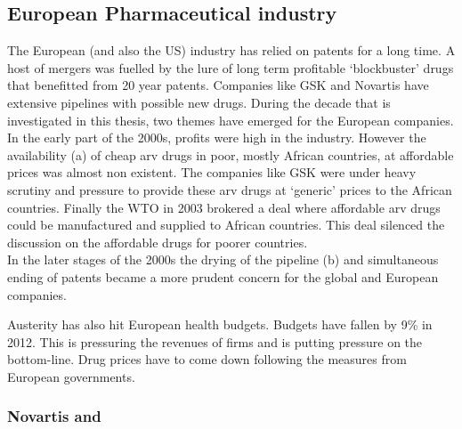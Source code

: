 \subsection{European Pharmaceutical industry}
The European (and also the US) \pharma industry has relied on patents for a long time.
A host of mergers was fuelled by the lure of long term profitable `blockbuster' drugs that benefitted from 20 year patents.
Companies like GSK and Novartis have extensive pipelines with possible new drugs.
During the decade that is investigated in this thesis, two themes have emerged for the European \pharma companies.\\
In the early part of the 2000s, profits were high in the \pharma industry.
However the availability (a) of cheap \gls{arv} drugs in poor, mostly African countries, at affordable prices was almost non existent.
The \pharma companies like \gls{GSK} were under heavy scrutiny and pressure to provide these \gls{arv} drugs at `generic' prices to the African countries.
Finally the WTO in 2003 brokered a deal where affordable \gls{arv} drugs could be manufactured and supplied to African countries.
This deal silenced the discussion on the affordable drugs for poorer countries.\\
In the later stages of the 2000s the drying of the pipeline (b) and simultaneous ending of patents became a more prudent concern for the global and European \pharma companies. 

Austerity has also hit European health budgets.
Budgets have fallen by 9\% in 2012.
This is pressuring the revenues of \pharma firms and is putting pressure on the bottom-line. 
Drug prices have to come down following the measures from European governments.

\subsubsection{Novartis and }

